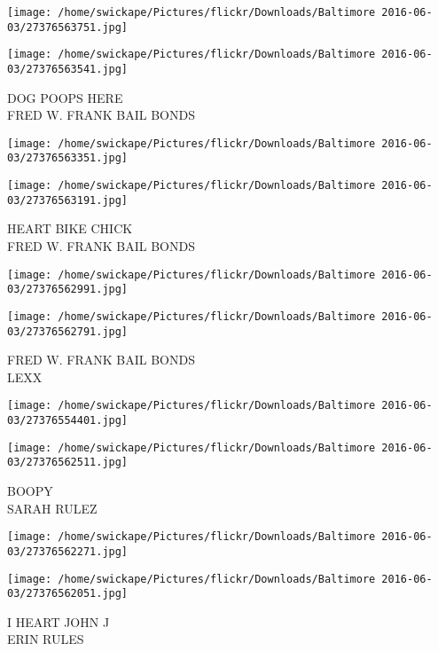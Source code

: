 \documentclass[10pt,letterpaper]{article}
\begin{document}
\texttt{[image: /home/swickape/Pictures/flickr/Downloads/Baltimore 2016-06-03/27376563751.jpg]}

\vspace{0.25in}
\texttt{[image: /home/swickape/Pictures/flickr/Downloads/Baltimore 2016-06-03/27376563541.jpg]}

DOG POOPS HERE\\
FRED W. FRANK BAIL BONDS\\
\pagebreak

\texttt{[image: /home/swickape/Pictures/flickr/Downloads/Baltimore 2016-06-03/27376563351.jpg]}

\vspace{0.25in}
\texttt{[image: /home/swickape/Pictures/flickr/Downloads/Baltimore 2016-06-03/27376563191.jpg]}

HEART BIKE CHICK\\
FRED W. FRANK BAIL BONDS\\
\pagebreak

\texttt{[image: /home/swickape/Pictures/flickr/Downloads/Baltimore 2016-06-03/27376562991.jpg]}

\vspace{0.25in}
\texttt{[image: /home/swickape/Pictures/flickr/Downloads/Baltimore 2016-06-03/27376562791.jpg]}

FRED W. FRANK BAIL BONDS\\
LEXX\\
\pagebreak

\texttt{[image: /home/swickape/Pictures/flickr/Downloads/Baltimore 2016-06-03/27376554401.jpg]}

\vspace{0.25in}
\texttt{[image: /home/swickape/Pictures/flickr/Downloads/Baltimore 2016-06-03/27376562511.jpg]}

BOOPY\\
SARAH RULEZ\\
\pagebreak

\texttt{[image: /home/swickape/Pictures/flickr/Downloads/Baltimore 2016-06-03/27376562271.jpg]}

\vspace{0.25in}
\texttt{[image: /home/swickape/Pictures/flickr/Downloads/Baltimore 2016-06-03/27376562051.jpg]}

I HEART JOHN J\\
ERIN RULES\\
\pagebreak
\end{document}
